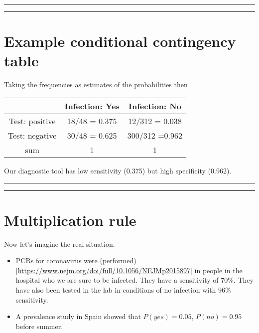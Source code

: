 \documentclass[
]{book}
\begin{document}
\begin{center}\rule{0.5\linewidth}{0.5pt}\end{center}

\begin{center}\rule{0.5\linewidth}{0.5pt}\end{center}

\hypertarget{example-conditional-contingency-table}{%
\section{Example conditional contingency table}\label{example-conditional-contingency-table}}

Taking the frequencies as estimates of the probabilities then

\begin{longtable}[]{@{}ccc@{}}
\toprule
& Infection: Yes & Infection: No \\
\midrule
\endhead
Test: positive & 18/48 = 0.375 & 12/312 = 0.038 \\
Test: negative & 30/48 = 0.625 & 300/312 =0.962 \\
sum & 1 & 1 \\
\bottomrule
\end{longtable}

Our diagnostic tool has low sensitivity (0.375) but high
specificity (0.962).

\begin{center}\rule{0.5\linewidth}{0.5pt}\end{center}

\begin{center}\rule{0.5\linewidth}{0.5pt}\end{center}

\hypertarget{multiplication-rule}{%
\section{Multiplication rule}\label{multiplication-rule}}

Now let's imagine the real situation.

\begin{itemize}
\item
  PCRs for coronavirus were (performed){[}\url{https://www.nejm.org/doi/full/10.1056/NEJMp2015897}{]} in people in the hospital who we are sure to be infected. They have a sensitivity of 70\%. They have also been tested in the lab in conditions of no infection with 96\% sensitivity.
\item
  A prevalence study in Spain showed that \(P(yes)=0.05\), \(P(no)=0.95\) before summer.
\end{itemize}
\end{document}
